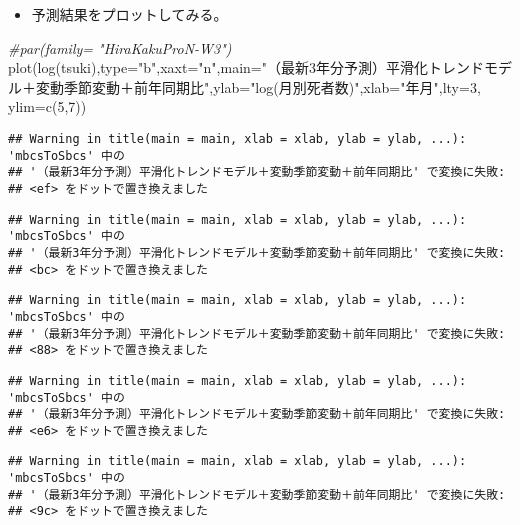 \documentclass[]{article}
\newenvironment{Shaded}{\begin{snugshade}}{\end{snugshade}}
\newcommand{\AttributeTok}[1]{\textcolor[rgb]{0.77,0.63,0.00}{#1}}
\newcommand{\CommentTok}[1]{\textcolor[rgb]{0.56,0.35,0.01}{\textit{#1}}}
\newcommand{\DecValTok}[1]{\textcolor[rgb]{0.00,0.00,0.81}{#1}}
\newcommand{\FunctionTok}[1]{\textcolor[rgb]{0.00,0.00,0.00}{#1}}
\newcommand{\NormalTok}[1]{#1}
\newcommand{\StringTok}[1]{\textcolor[rgb]{0.31,0.60,0.02}{#1}}
\providecommand{\tightlist}{%
  \setlength{\itemsep}{0pt}\setlength{\parskip}{0pt}}
\begin{document}
\begin{itemize}
\tightlist
\item
  予測結果をプロットしてみる。
\end{itemize}

\begin{Shaded}
\begin{Highlighting}[]
\CommentTok{\#par(family= "HiraKakuProN{-}W3")}
\FunctionTok{plot}\NormalTok{(}\FunctionTok{log}\NormalTok{(tsuki),}\AttributeTok{type=}\StringTok{"b"}\NormalTok{,}\AttributeTok{xaxt=}\StringTok{"n"}\NormalTok{,}\AttributeTok{main=}\StringTok{"（最新3年分予測）平滑化トレンドモデル＋変動季節変動＋前年同期比"}\NormalTok{,}\AttributeTok{ylab=}\StringTok{"log(月別死者数)"}\NormalTok{,}\AttributeTok{xlab=}\StringTok{"年月"}\NormalTok{,}\AttributeTok{lty=}\DecValTok{3}\NormalTok{, }\AttributeTok{ylim=}\FunctionTok{c}\NormalTok{(}\DecValTok{5}\NormalTok{,}\DecValTok{7}\NormalTok{))}
\end{Highlighting}
\end{Shaded}

\begin{verbatim}
## Warning in title(main = main, xlab = xlab, ylab = ylab, ...): 'mbcsToSbcs' 中の
## '（最新3年分予測）平滑化トレンドモデル＋変動季節変動＋前年同期比' で変換に失敗:
## <ef> をドットで置き換えました
\end{verbatim}

\begin{verbatim}
## Warning in title(main = main, xlab = xlab, ylab = ylab, ...): 'mbcsToSbcs' 中の
## '（最新3年分予測）平滑化トレンドモデル＋変動季節変動＋前年同期比' で変換に失敗:
## <bc> をドットで置き換えました
\end{verbatim}

\begin{verbatim}
## Warning in title(main = main, xlab = xlab, ylab = ylab, ...): 'mbcsToSbcs' 中の
## '（最新3年分予測）平滑化トレンドモデル＋変動季節変動＋前年同期比' で変換に失敗:
## <88> をドットで置き換えました
\end{verbatim}

\begin{verbatim}
## Warning in title(main = main, xlab = xlab, ylab = ylab, ...): 'mbcsToSbcs' 中の
## '（最新3年分予測）平滑化トレンドモデル＋変動季節変動＋前年同期比' で変換に失敗:
## <e6> をドットで置き換えました
\end{verbatim}

\begin{verbatim}
## Warning in title(main = main, xlab = xlab, ylab = ylab, ...): 'mbcsToSbcs' 中の
## '（最新3年分予測）平滑化トレンドモデル＋変動季節変動＋前年同期比' で変換に失敗:
## <9c> をドットで置き換えました
\end{verbatim}
\end{document}
